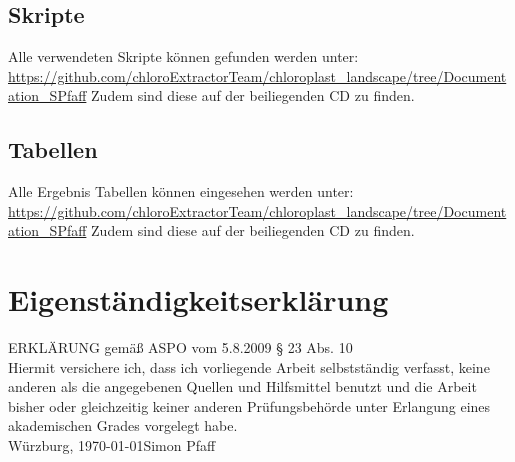 \documentclass{scrartcl}
\begin{document}
\subsection{Skripte}
\label{sec-7-3}
Alle verwendeten Skripte können gefunden werden unter:
\\
\url{https://github.com/chloroExtractorTeam/chloroplast_landscape/tree/Documentation_SPfaff}
Zudem sind diese auf der beiliegenden CD zu finden.
\subsection{Tabellen}
\label{sec-7-4}
Alle Ergebnis Tabellen können eingesehen werden unter: 
\\
\url{https://github.com/chloroExtractorTeam/chloroplast_landscape/tree/Documentation_SPfaff}
Zudem sind diese auf der beiliegenden CD zu finden.
\clearpage
\section*{Eigenständigkeitserklärung}
ERKLÄRUNG gemäß ASPO vom 5.8.2009 § 23 Abs. 10\\[10mm]
Hiermit versichere ich, dass ich vorliegende Arbeit selbstständig verfasst, keine anderen als
die angegebenen Quellen und Hilfsmittel benutzt und die Arbeit bisher oder gleichzeitig
keiner anderen Prüfungsbehörde unter Erlangung eines akademischen Grades
vorgelegt habe.\\[20mm]
Würzburg, \today \hfill Simon Pfaff
\clearpage
\end{document}
